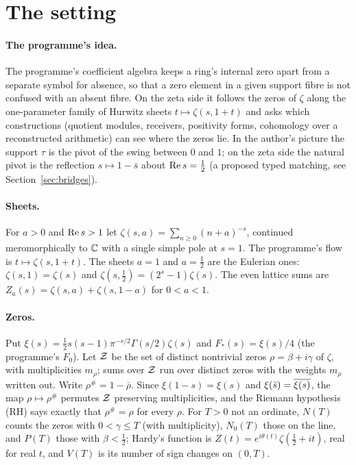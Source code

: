 \section{The setting}\label{sec:setting}

\paragraph{The programme's idea.}
The programme's coefficient algebra keeps a ring's internal zero apart from a separate symbol for absence, so that a zero element in a given support fibre is not confused with an absent fibre.
On the zeta side it follows the zeros of $\zeta$ along the one-parameter family of Hurwitz sheets $t\mapsto\zeta(s,1+t)$ and asks which constructions (quotient modules, receivers, positivity forms, cohomology over a reconstructed arithmetic) can see where the zeros lie.
In the author's picture the support $\tau$ is the pivot of the swing between $0$ and $1$; on the zeta side the natural pivot is the reflection $s\mapsto 1-\bar s$ about $\operatorname{Re} s=\tfrac12$ (a proposed typed matching, see Section~\ref{sec:bridges}).

\paragraph{Sheets.}
For $a>0$ and $\operatorname{Re} s>1$ let $\zeta(s,a)=\sum_{n\ge0}(n+a)^{-s}$, continued meromorphically to $\mathbb{C}$ with a single simple pole at $s=1$.
The programme's flow is $t\mapsto\zeta(s,1+t)$.
The sheets $a=1$ and $a=\tfrac12$ are the Eulerian ones: $\zeta(s,1)=\zeta(s)$ and $\zeta(s,\tfrac12)=(2^s-1)\zeta(s)$.
The even lattice sums are $Z_a(s)=\zeta(s,a)+\zeta(s,1-a)$ for $0<a<1$.

\paragraph{Zeros.}
Put $\xi(s)=\tfrac12 s(s-1)\pi^{-s/2}\Gamma(s/2)\zeta(s)$ and $F_*(s)=\xi(s)/4$ (the programme's $F_0$).
Let $\mathcal{Z}$ be the set of distinct nontrivial zeros $\rho=\beta+i\gamma$ of $\zeta$, with multiplicities $m_\rho$; sums over $\mathcal{Z}$ run over distinct zeros with the weights $m_\rho$ written out.
Write $\rho^{\#}=1-\bar\rho$.
Since $\xi(1-s)=\xi(s)$ and $\xi(\bar s)=\overline{\xi(s)}$, the map $\rho\mapsto\rho^{\#}$ permutes $\mathcal{Z}$ preserving multiplicities, and the Riemann hypothesis (RH) says exactly that $\rho^{\#}=\rho$ for every $\rho$.
For $T>0$ not an ordinate, $N(T)$ counts the zeros with $0<\gamma\le T$ (with multiplicity), $N_0(T)$ those on the line, and $P(T)$ those with $\beta<\tfrac12$; Hardy's function is $Z(t)=e^{i\theta(t)}\zeta(\tfrac12+it)$, real for real $t$, and $V(T)$ is its number of sign changes on $(0,T)$.

